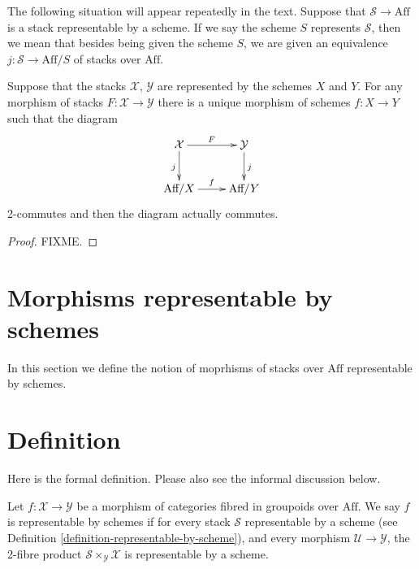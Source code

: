\begin{situation}
\label{situation-stack-represented-by-scheme}
The following situation will appear repeatedly in the text. Suppose that
$\mathcal{S} \to \text{Aff}$ is a stack representable by a scheme. If we
say the scheme $S$ represents $\mathcal{S}$, then we mean that besides 
being given the scheme $S$, we are given an equivalence $j : \mathcal{S}
\to \text{Aff}/S$ of stacks over $\text{Aff}$.
\end{situation}

\begin{lemma}
\label{lemma-morphism-stacks-representable-by-schemes}
Suppose that the stacks $\mathcal{X}$, $\mathcal{Y}$ are represented
by the schemes $X$ and $Y$. For any morphism of stacks $F : \mathcal{X}
\to \mathcal{Y}$ there is a unique morphism of schemes $f : X \to Y$
such that the diagram
$$
\xymatrix{
\mathcal{X} \ar[r]^F \ar[d]_j & \mathcal{Y} \ar[d]^j \\
\text{Aff}/X \ar[r]^f & \text{Aff}/Y}
$$
2-commutes and then the diagram actually commutes.
\end{lemma}

\begin{proof}
FIXME.
\end{proof}

\section{Morphisms representable by schemes}
\label{section-morphisms-representable-by-schemes}

\noindent
In this section we define the notion of moprhisms of stacks over $\text{Aff}$
representable by schemes.

\section{Definition}
\label{section-definition-representable-by-schemes}

\noindent
Here is the formal definition. Please also see the informal discussion below.

\begin{definition}
\label{definition-representable-by-schemes}
Let $f : \mathcal{X} \to \mathcal{Y}$ be a morphism of categories
fibred in groupoids over $\text{Aff}$. We say $f$ is representable by
schemes if for every stack $\mathcal{S}$ representable by a scheme
(see Definition \ref{definition-representable-by-scheme}), and every morphism
$\mathcal{U} \to \mathcal{Y}$, the 2-fibre product
$\mathcal{S}\times_\mathcal{Y}\mathcal{X}$ is representable by a scheme.
\end{definition}

